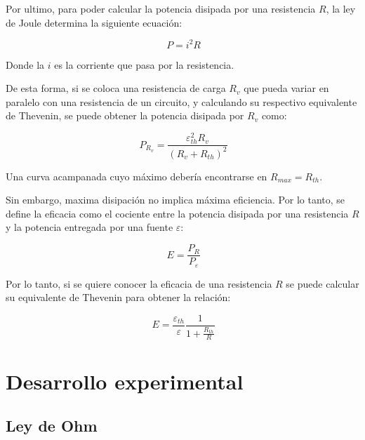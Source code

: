 \documentclass[11pt,a4paper]{article}
\begin{document}
Por ultimo, para poder calcular la potencia disipada por una resistencia $R$, la ley de Joule determina la siguiente ecuación:

\begin{equation}\label{Joule}
\ P = i^2 R
\end{equation}

Donde la $i$ es la corriente que pasa por la resistencia. 

De esta forma, si se coloca una resistencia de carga $R_{v}$ que pueda variar en paralelo con una resistencia de un circuito, y calculando su respectivo equivalente de Thevenin, se puede obtener la potencia disipada por $R_{v}$ como:

\begin{equation}\label{Pot}
\ P_{R_{v}}=\frac{\varepsilon_{th}^2 R_{v}}{(R_{v}+R_{th})^2}
\end{equation}

Una curva acampanada cuyo máximo debería encontrarse en $R_{max} = R_{th}$.

Sin embargo, maxima disipación no implica máxima eficiencia. Por lo tanto, se define la eficacia como el cociente entre la potencia disipada por una resistencia $R$ y la potencia entregada por una fuente $\varepsilon$:

\begin{equation}\label{eficacia}
\ E=\frac{P_{R}}{P_{\varepsilon}}
\end{equation}

Por lo tanto, si se quiere conocer la eficacia de una resistencia $R$ se puede calcular su equivalente de Thevenin para obtener la relación:

\begin{equation}\label{efi}
\ E= \frac{\varepsilon_{th}}{\varepsilon}\frac{1}{1+\frac{R_{th}}{R}}
\end{equation}


\section{Desarrollo experimental}

\subsection{Ley de Ohm}
\end{document}
